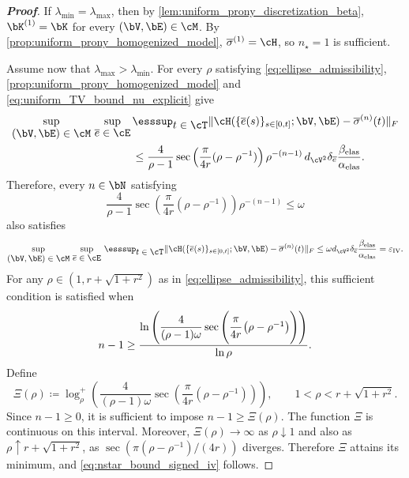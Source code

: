 \begin{proof}[\bf Proof]
If $\lambda_{\min}=\lambda_{\max}$, then by \cref{lem:uniform_prony_discretization_beta}, $\bK^{(1)}=\bK$ for every $(\bV,\bE)\in\cM$. By \cref{prop:uniform_prony_homogenized_model}, $\overline{\sigma}^{(1)}=\cH$, so $n_\star=1$ is sufficient.

Assume now that $\lambda_{\max}>\lambda_{\min}$. For every $\rho$ satisfying \cref{eq:ellipse_admissibility},
\cref{prop:uniform_prony_homogenized_model} and \cref{eq:uniform_TV_bound_nu_explicit} give
\begin{align*}
\sup_{\displaystyle(\bV,\bE)\in\cM}\,\sup_{\displaystyle\overline{e}\in\cE}\,&\esssup_{\displaystyle t\in\cT}
\|\cH(\{\overline{e}(s)\}_{s\in[0,t]};\bV,\bE)-\overline{\sigma}^{(n)}(t)\|_F\\
&\leq
\frac{4}{\rho-1}
\sec\left(\frac{\pi}{4r}(\rho-\rho^{-1})\right)
\rho^{-(n-1)}
\,d_{\cV^2}\delta_{\overline e}\frac{\beta_{\rm elas}}{\alpha_{\rm elas}}.
\end{align*}
Therefore, every $n\in\bN$ satisfying
\begin{equation*}
\frac{4}{\rho-1}
\sec\left(\frac{\pi}{4r}(\rho-\rho^{-1})\right)
\rho^{-(n-1)}
\leq \omega
\end{equation*}
also satisfies
\begin{equation*}
\sup_{\displaystyle(\bV,\bE)\in\cM}\,\sup_{\displaystyle\overline{e}\in\cE}\,\esssup_{\displaystyle t\in\cT}
\|\cH(\{\overline{e}(s)\}_{s\in[0,t]};\bV,\bE)-\overline{\sigma}^{(n)}(t)\|_F
\leq
\omega d_{\cV^2}\delta_{\overline e}\frac{\beta_{\rm elas}}{\alpha_{\rm elas}}
=\varepsilon_{\mathrm{IV}}.
\end{equation*}
For any $\rho\in(1, r + \sqrt{1 + r^2})$ as in \cref{eq:ellipse_admissibility}, this sufficient condition is satisfied when
\begin{equation*}
n-1
\geq
\frac{
\ln\left(
\dfrac{4}{(\rho-1)\omega}
\sec\left(\cfrac{\pi}{4r}\left(\rho-\rho^{-1}\right)\right)
\right)
}{\ln\rho}.
\end{equation*}
Define
\begin{equation*}
\Xi(\rho)
\coloneqq
\log^+_{\rho}\left(
\dfrac{4}{(\rho-1)\omega}
\sec\left(\frac{\pi}{4r}(\rho-\rho^{-1})\right)
\right),
\qquad
1<\rho<r+\sqrt{1+r^2}.
\end{equation*}
Since $n-1\ge 0$, it is sufficient to impose $n-1\ge \Xi(\rho)$.
The function $\Xi$ is continuous on this interval. Moreover, $\Xi(\rho)\to\infty$ as $\rho\downarrow 1$ and also as $\rho\uparrow r+\sqrt{1+r^2}$, as $\sec\left(\pi(\rho-\rho^{-1})/(4r)\right)$ diverges. Therefore $\Xi$ attains its minimum, and \cref{eq:nstar_bound_signed_iv} follows.


\end{proof}
